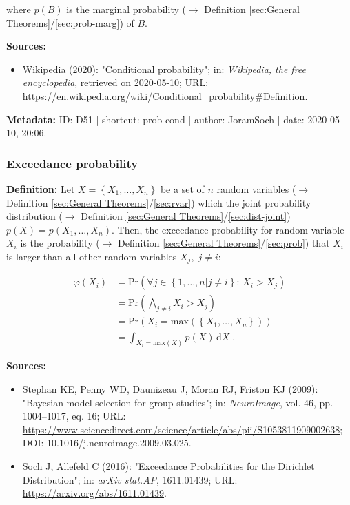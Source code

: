 \documentclass[a4paper,12pt,twoside]{book}
\begin{document}
where $p(B)$ is the marginal probability ($\rightarrow$ Definition \ref{sec:General Theorems}/\ref{sec:prob-marg}) of $B$.


\vspace{1em}
\textbf{Sources:}
\begin{itemize}
\item Wikipedia (2020): "Conditional probability"; in: \textit{Wikipedia, the free encyclopedia}, retrieved on 2020-05-10; URL: \url{https://en.wikipedia.org/wiki/Conditional_probability#Definition}.
\end{itemize}


\vspace{1em}
\textbf{Metadata:} ID: D51 | shortcut: prob-cond | author: JoramSoch | date: 2020-05-10, 20:06.
\vspace{1em}



\subsubsection[\textit{Exceedance probability}]{Exceedance probability} \label{sec:prob-exc}
\setcounter{equation}{0}

\textbf{Definition:} Let $X = \left\lbrace X_1, \ldots, X_n \right\rbrace$ be a set of $n$ random variables ($\rightarrow$ Definition \ref{sec:General Theorems}/\ref{sec:rvar}) which the joint probability distribution ($\rightarrow$ Definition \ref{sec:General Theorems}/\ref{sec:dist-joint}) $p(X) = p(X_1, \ldots, X_n)$. Then, the exceedance probability for random variable $X_i$ is the probability ($\rightarrow$ Definition \ref{sec:General Theorems}/\ref{sec:prob}) that $X_i$ is larger than all other random variables $X_j, \; j \neq i$:

\begin{equation} \label{eq:prob-exc-EP}
\begin{split}
\varphi(X_i) &= \mathrm{Pr}\left( \forall j \in \left\lbrace 1, \ldots, n | j \neq i \right\rbrace: \, X_i > X_j \right) \\
&= \mathrm{Pr}\left( \bigwedge_{j \neq i} X_i > X_j \right) \\
&= \mathrm{Pr}\left( X_i = \mathrm{max}(\left\lbrace X_1, \ldots, X_n \right\rbrace) \right) \\
&= \int_{X_i = \mathrm{max}(X)} p(X) \, \mathrm{d}X \; .
\end{split}
\end{equation}


\vspace{1em}
\textbf{Sources:}
\begin{itemize}
\item Stephan KE, Penny WD, Daunizeau J, Moran RJ, Friston KJ (2009): "Bayesian model selection for group studies"; in: \textit{NeuroImage}, vol. 46, pp. 1004–1017, eq. 16; URL: \url{https://www.sciencedirect.com/science/article/abs/pii/S1053811909002638}; DOI: 10.1016/j.neuroimage.2009.03.025.
\item Soch J, Allefeld C (2016): "Exceedance Probabilities for the Dirichlet Distribution"; in: \textit{arXiv stat.AP}, 1611.01439; URL: \url{https://arxiv.org/abs/1611.01439}.
\end{itemize}
\end{document}
